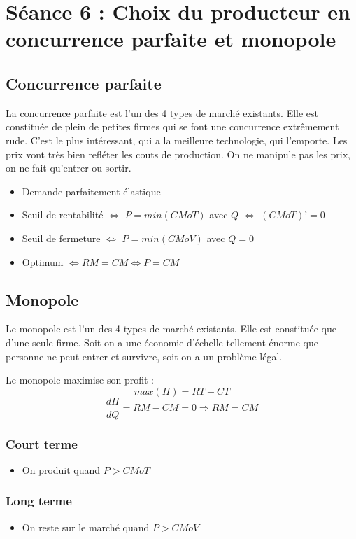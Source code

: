 \section{Séance 6 : Choix du producteur en concurrence parfaite et monopole}


\subsection{Concurrence parfaite}
La concurrence parfaite est l'un des 4 types de marché existants. Elle est constituée de plein de petites firmes qui se font une concurrence extrêmement rude. C'est le plus intéressant, qui a la meilleure technologie, qui l'emporte. Les prix vont très bien refléter les couts de production. On ne manipule pas les prix, on ne fait qu'entrer ou sortir.
\begin{itemize}
	\item Demande parfaitement élastique
	\item Seuil de rentabilité $\Leftrightarrow$ $P = min( CMoT )$ avec $Q$ $\Leftrightarrow$ $(CMoT)’ = 0$
	\item Seuil de fermeture $\Leftrightarrow$ $P = min( CMoV )$ avec $Q = 0$
	\item Optimum $\Leftrightarrow RM = CM \Leftrightarrow P = CM$
\end{itemize}



\subsection{Monopole}
Le monopole est l'un des 4 types de marché existants. Elle est constituée que d'une seule firme. Soit on a une économie d'échelle tellement énorme que personne ne peut entrer et survivre, soit on a un problème légal.

Le monopole maximise son profit :
$$max( \Pi ) = RT - CT$$
$$\frac{d\Pi}{dQ} = RM - CM = 0 \Rightarrow RM = CM$$



\subsubsection{Court terme}
\begin{itemize}
	\item On produit quand $P > CMoT$
\end{itemize}



\subsubsection{Long terme}
\begin{itemize}
	\item On reste sur le marché quand $P > CMoV$
\end{itemize}

